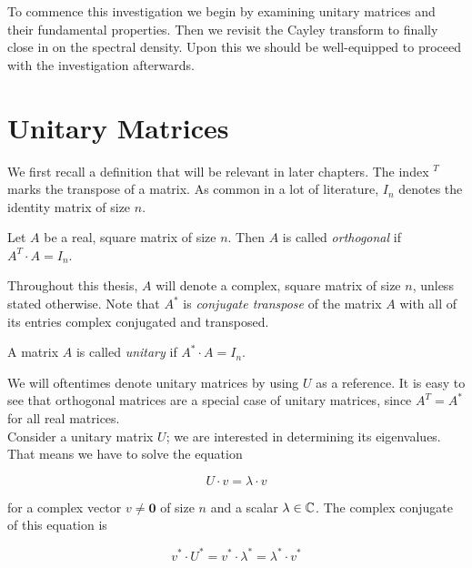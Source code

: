 To commence this investigation we begin by examining unitary matrices and their fundamental properties.
Then we revisit the Cayley transform to finally close in on the spectral density.
Upon this we should be well-equipped to proceed with the investigation afterwards.

\section{Unitary Matrices}

We first recall a definition that will be relevant in later chapters.
The index $^T$ marks the transpose of a matrix.
As common in a lot of literature, $I_n$ denotes the identity matrix of size $n$.

\begin{definition}
    Let $A$ be a real, square matrix of size $n$.
    Then $A$ is called \emph{orthogonal} if $A^T \cdot A = I_n$.
\end{definition}

Throughout this thesis, $A$ will denote a complex, square matrix of size $n$, unless stated otherwise.
Note that $A^*$ is \emph{conjugate transpose} of the matrix $A$ with all of its entries complex conjugated and transposed.

\begin{definition}
    A matrix $A$ is called \emph{unitary} if $A^* \cdot A = I_n$.
\end{definition}

We will oftentimes denote unitary matrices by using $U$ as a reference.
It is easy to see that orthogonal matrices are a special case of unitary matrices, since $A^T = A^*$ for all real matrices.\\
Consider a unitary matrix $U$; we are interested in determining its eigenvalues.
That means we have to solve the equation

\begin{equation} \label{eq:eigenvalue_equation}
    U \cdot v = \lambda \cdot v
\end{equation}

for a complex vector $v \neq \mathbf{0}$ of size $n$ and a scalar $\lambda \in \mathbb{C}$.
The complex conjugate of this equation is

\begin{equation} \label{eq:eigenvalue_equation_complex_conjugate}
    v^* \cdot U^* = v^* \cdot \lambda^* = \lambda^* \cdot v^*
\end{equation}

